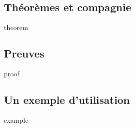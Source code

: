 \subsection{Théorèmes et compagnie}

{theorem}


\subsection{Preuves}

{proof}


\subsection{Un exemple d'utilisation}

{example}